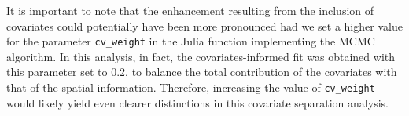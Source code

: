 \documentclass[12pt,	%
	a4paper,		%
	twoside,		%
	openright,		%
	titlepage,%
	]{book}
\theoremstyle{definition}
\newcommand{\mjline}[1]{\texttt{#1}}
\begin{document}
It is important to note that the enhancement resulting from the inclusion of covariates could potentially have been more pronounced had we set a higher value for the parameter \mjline{cv_weight} in the Julia function implementing the MCMC algorithm. In this analysis, in fact, the covariates-informed fit was obtained with this parameter set to 0.2, to balance the total contribution of the covariates with that of the spatial information. Therefore, increasing the value of \mjline{cv_weight} would likely yield even clearer distinctions in this covariate separation analysis.

\end{document}
